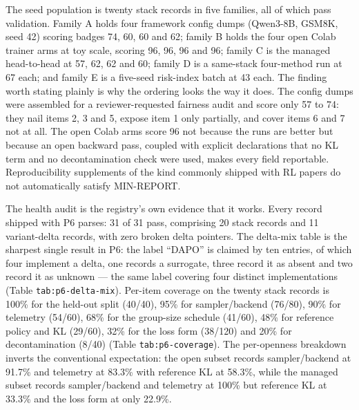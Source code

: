 \documentclass[12pt,a4paper]{report}
\begin{document}
The seed population is twenty stack records in five families, all of
which pass validation. Family A holds four framework config dumps
(Qwen3-8B, GSM8K, seed 42) scoring badges 74, 60, 60 and 62; family B
holds the four open Colab trainer arms at toy scale, scoring 96, 96, 96
and 96; family C is the managed head-to-head at 57, 62, 62 and 60;
family D is a same-stack four-method run at 67 each; and family E is a
five-seed risk-index batch at 43 each. The finding worth stating plainly
is why the ordering looks the way it does. The config dumps were
assembled for a reviewer-requested fairness audit and score only 57 to
74: they nail items 2, 3 and 5, expose item 1 only partially, and cover
items 6 and 7 not at all. The open Colab arms score 96 not because the
runs are better but because an open backward pass, coupled with explicit
declarations that no KL term and no decontamination check were used,
makes every field reportable. Reproducibility supplements of the kind
commonly shipped with RL papers do not automatically satisfy MIN-REPORT.

The health audit is the registry's own evidence that it works. Every
record shipped with P6 parses: 31 of 31 pass, comprising 20 stack
records and 11 variant-delta records, with zero broken delta pointers.
The delta-mix table is the sharpest single result in P6: the label
``DAPO'' is claimed by ten entries, of which four implement a delta, one
records a surrogate, three record it as absent and two record it as
unknown --- the same label covering four distinct implementations (Table
\texttt{tab:p6-delta-mix}). Per-item coverage on the twenty stack
records is 100\% for the held-out split (40/40), 95\% for
sampler/backend (76/80), 90\% for telemetry (54/60), 68\% for the
group-size schedule (41/60), 48\% for reference policy and KL (29/60),
32\% for the loss form (38/120) and 20\% for decontamination (8/40)
(Table \texttt{tab:p6-coverage}). The per-openness breakdown inverts the
conventional expectation: the open subset records sampler/backend at
91.7\% and telemetry at 83.3\% with reference KL at 58.3\%, while the
managed subset records sampler/backend and telemetry at 100\% but
reference KL at 33.3\% and the loss form at only 22.9\%.
\end{document}
